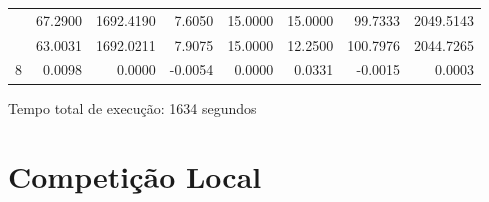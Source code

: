 \begin{table}[htb]
{\begin{tabular}{c|r|r|r|r|r|r|r}
 & 67.2900 & 1692.4190 & 7.6050 & 15.0000 & 15.0000 & 99.7333 & 2049.5143 \\ \cline{2-8} 
 & \cellcolor[HTML]{FFCE93}63.0031 & \cellcolor[HTML]{FFCE93}1692.0211 & \cellcolor[HTML]{FFCE93}7.9075 & \cellcolor[HTML]{FFCE93}15.0000 & \cellcolor[HTML]{FFCE93}12.2500 & \cellcolor[HTML]{FFCE93}100.7976 & \cellcolor[HTML]{FFCE93}2044.7265 \\ \cline{2-8} 
\multirow{-3}{*}{8} & \cellcolor[HTML]{ADDDAD}0.0098 & \cellcolor[HTML]{ADDDAD}0.0000 & \cellcolor[HTML]{ADDDAD}-0.0054 & \cellcolor[HTML]{ADDDAD}0.0000 & \cellcolor[HTML]{ADDDAD}0.0331 & \cellcolor[HTML]{ADDDAD}-0.0015 & \cellcolor[HTML]{ADDDAD}0.0003 \\ \hline
\end{tabular}%
}
\end{table}

Tempo total de execução: 1634 segundos

\pagebreak
\section{Competição Local}

